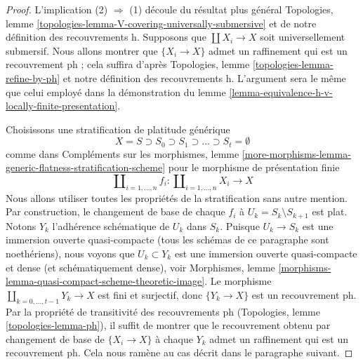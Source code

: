 \begin{proof}
L'implication (2) $\Rightarrow$ (1) découle du résultat plus général
Topologies, lemme \ref{topologies-lemma-V-covering-universally-submersive}
et de notre définition des recouvrements h. Supposons que $\coprod X_i \to X$
soit universellement submersif. Nous allons montrer que $\{X_i \to X\}$
admet un raffinement qui est un recouvrement ph ; cela suffira d'après
Topologies, lemme \ref{topologies-lemma-refine-by-ph} et
notre définition des recouvrements h.
L'argument sera le même que celui employé dans la démonstration du
lemme \ref{lemma-equivalence-h-v-locally-finite-presentation}.

\medskip\noindent
Choisissons une stratification de platitude générique
$$
X = S \supset S_0 \supset S_1 \supset \ldots \supset S_t = \emptyset
$$
comme dans Compléments sur les morphismes, lemme
\ref{more-morphisms-lemma-generic-flatness-stratification-scheme}
pour le morphisme de présentation finie
$$
\coprod\nolimits_{i = 1, \ldots, n} f_i :
\coprod\nolimits_{i = 1, \ldots, n} X_i
\longrightarrow
X
$$
Nous allons utiliser toutes les propriétés de la stratification
sans autre mention. Par construction, le changement de base de chaque
$f_i$ à $U_k = S_k \setminus S_{k + 1}$ est plat.
Notons $Y_k$ l'adhérence schématique de $U_k$ dans $S_k$. Puisque
$U_k \to S_k$ est une immersion ouverte quasi-compacte (tous les schémas de
ce paragraphe sont noethériens),
nous voyons que $U_k \subset Y_k$ est une immersion ouverte quasi-compacte et dense
(et schématiquement dense), voir
Morphismes, lemme \ref{morphisms-lemma-quasi-compact-scheme-theoretic-image}.
Le morphisme $\coprod_{k = 0, \ldots, t - 1} Y_k \to X$
est fini et surjectif, donc $\{Y_k \to X\}$ est un recouvrement ph.
Par la propriété de transitivité des recouvrements ph
(Topologies, lemme \ref{topologies-lemma-ph}),
il suffit de montrer que le recouvrement obtenu par changement de base
de $\{X_i \to X\}$ à chaque $Y_k$ admet un raffinement qui est un
recouvrement ph. Cela nous ramène au cas décrit dans le
paragraphe suivant.


\end{proof}
